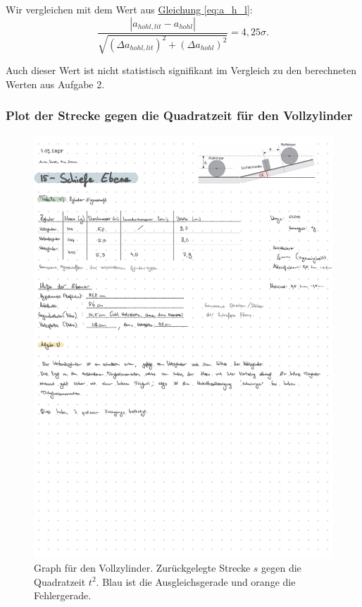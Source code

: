 Wir vergleichen mit dem Wert aus \hyperref[eq:a_h_l]{Gleichung \ref*{eq:a_h_l}}:
\begin{equation}
    \frac{\left| a_{hohl,lit} - a_{hohl} \right|}{\sqrt{(\Delta a_{hohl,lit})^2 + (\Delta a_{hohl})^2}} = 4,25\sigma.
\end{equation}

Auch dieser Wert ist nicht statistisch signifikant im Vergleich zu den berechneten Werten aus Aufgabe 2.


\onecolumn
\subsubsection*{Plot der Strecke gegen die Quadratzeit für den Vollzylinder}
\begin{figure}[!ht]
    \centering
    \hspace*{-2.35cm}
    \includegraphics[width=1.3\textwidth, page=3]{Protokolle/15/Chapter/Messprotokoll}
    \caption{Graph für den Vollzylinder. Zurückgelegte Strecke $s$ gegen die Quadratzeit $t^2$. Blau ist die Ausgleichsgerade und orange die Fehlergerade.}
    \label{fig:voll}
\end{figure}

